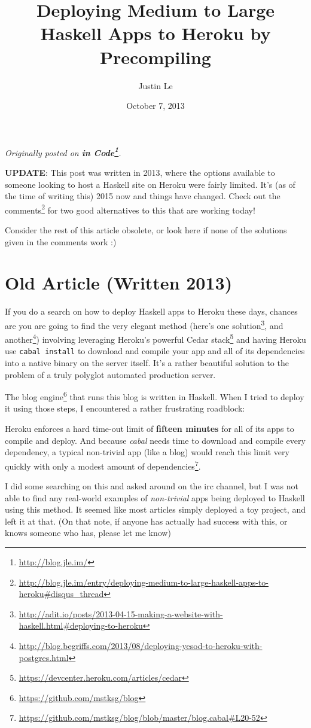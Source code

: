 \documentclass[]{article}
\title{Deploying Medium to Large Haskell Apps to Heroku by Precompiling}
\author{Justin Le}
\date{October 7, 2013}
\renewcommand{\href}[2]{#2\footnote{\url{#1}}}
\begin{document}
\maketitle

\emph{Originally posted on \textbf{\href{http://blog.jle.im/}{in
Code}}.}

\textbf{UPDATE}: This post was written in 2013, where the options
available to someone looking to host a Haskell site on Heroku were
fairly limited. It's (as of the time of writing this) 2015 now and
things have changed. Check out
\href{http://blog.jle.im/entry/deploying-medium-to-large-haskell-apps-to-heroku\#disqus_thread}{the
comments} for two good alternatives to this that are working today!

Consider the rest of this article obsolete, or look here if none of the
solutions given in the comments work :)

\section{Old Article (Written 2013)}\label{old-article-written-2013}

If you do a search on how to deploy Haskell apps to Heroku these days,
chances are you are going to find the very elegant method (here's
\href{http://adit.io/posts/2013-04-15-making-a-website-with-haskell.html\#deploying-to-heroku}{one
solution}, and
\href{http://blog.begriffs.com/2013/08/deploying-yesod-to-heroku-with-postgres.html}{another})
involving leveraging Heroku's powerful
\href{https://devcenter.heroku.com/articles/cedar}{Cedar stack} and
having Heroku use \texttt{cabal\ install} to download and compile your
app and all of its dependencies into a native binary on the server
itself. It's a rather beautiful solution to the problem of a truly
polyglot automated production server.

The \href{https://github.com/mstksg/blog}{blog engine} that runs this
blog is written in Haskell. When I tried to deploy it using those steps,
I encountered a rather frustrating roadblock:

Heroku enforces a hard time-out limit of \textbf{fifteen minutes} for
all of its apps to compile and deploy. And because \emph{cabal} needs
time to download and compile every dependency, a typical non-trivial app
(like a blog) would reach this limit very quickly with only a
\href{https://github.com/mstksg/blog/blob/master/blog.cabal\#L20-52}{modest
amount of dependencies}.

I did some searching on this and asked around on the irc channel, but I
was not able to find any real-world examples of \emph{non-trivial} apps
being deployed to Haskell using this method. It seemed like most
articles simply deployed a toy project, and left it at that. (On that
note, if anyone has actually had success with this, or knows someone who
has, please let me know)
\end{document}
